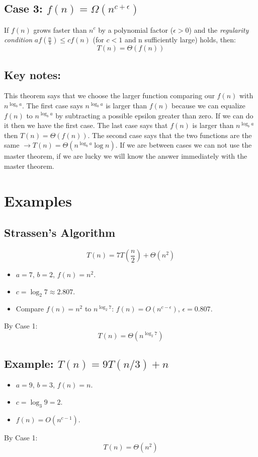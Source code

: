 \subsection{Case 3: \(f(n) = \Omega(n^{c + \epsilon})\)}
If \(f(n)\) grows faster than \(n^c\) by a polynomial factor (\(\epsilon > 0\)) and the \textit{regularity condition} \(a f(\frac{n}{b}) \leq cf(n)\) (for \(c < 1\) and n sufficiently large) holds, then:  
\[
T(n) = \Theta(f(n))
\]

\subsection{Key notes:}
This theorem says that we choose the larger function comparing our $f(n)$ with $n^{\log_b a}$. The first case says $n^{\log_b a}$ is larger than $f(n)$ because we can equalize $f(n)$ to $n^{\log_b a}$ by subtracting a possible epsilon greater than zero. If we can do it then we have the first case. The last case says that $f(n)$ is larger than $n^{\log_b a}$ then $T(n) = \Theta(f(n))$. The second case says that the two functions are the same  $\rightarrow T(n) = \Theta(n^{\log_b a}\log n)$. If we are between cases we can not use the master theorem, if we are lucky we will know the answer immediately with the master theorem.


\section{Examples}

\subsection{Strassen's Algorithm}
\[
T(n) = 7T\left(\frac{n}{2}\right) + \Theta(n^2)
\]
\begin{itemize}
    \item \(a = 7\), \(b = 2\), \(f(n) = n^2\).
    \item \(c = \log_2 7 \approx 2.807\).
    \item Compare \(f(n) = n^2\) to \(n^{\log_2 7}\): \(f(n) = O(n^{c - \epsilon})\), \(\epsilon = 0.807\).
\end{itemize}
By Case 1:  
\[
T(n) = \Theta(n^{\log_2 7})
\]

\subsection{Example: \(T(n) = 9T(n/3) + n\)}
\begin{itemize}
    \item \(a = 9\), \(b = 3\), \(f(n) = n\).
    \item \(c = \log_3 9 = 2\).
    \item \(f(n) = O(n^{c - 1})\).
\end{itemize}
By Case 1:  
\[
T(n) = \Theta(n^2)
\]


